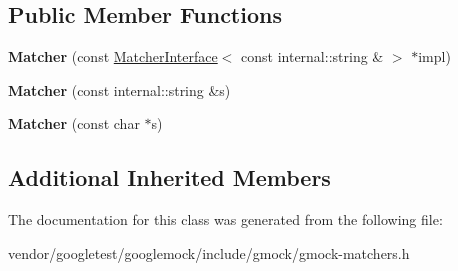\subsection*{Public Member Functions}
\begin{DoxyCompactItemize}
\item 
{\bfseries Matcher} (const \hyperlink{classtesting_1_1MatcherInterface}{Matcher\+Interface}$<$ const internal\+::string \& $>$ $\ast$impl)\hypertarget{classtesting_1_1Matcher_3_01const_01internal_1_1string_01_6_01_4_a45670b268a87239be6520c1b0fbe015e}{}\label{classtesting_1_1Matcher_3_01const_01internal_1_1string_01_6_01_4_a45670b268a87239be6520c1b0fbe015e}

\item 
{\bfseries Matcher} (const internal\+::string \&s)\hypertarget{classtesting_1_1Matcher_3_01const_01internal_1_1string_01_6_01_4_a3414bb154dfc4d19818a0c7878d662f4}{}\label{classtesting_1_1Matcher_3_01const_01internal_1_1string_01_6_01_4_a3414bb154dfc4d19818a0c7878d662f4}

\item 
{\bfseries Matcher} (const char $\ast$s)\hypertarget{classtesting_1_1Matcher_3_01const_01internal_1_1string_01_6_01_4_a7a98217eaa834207c4e51bb6d5283ed6}{}\label{classtesting_1_1Matcher_3_01const_01internal_1_1string_01_6_01_4_a7a98217eaa834207c4e51bb6d5283ed6}

\end{DoxyCompactItemize}
\subsection*{Additional Inherited Members}


The documentation for this class was generated from the following file\+:\begin{DoxyCompactItemize}
\item 
vendor/googletest/googlemock/include/gmock/gmock-\/matchers.\+h\end{DoxyCompactItemize}
